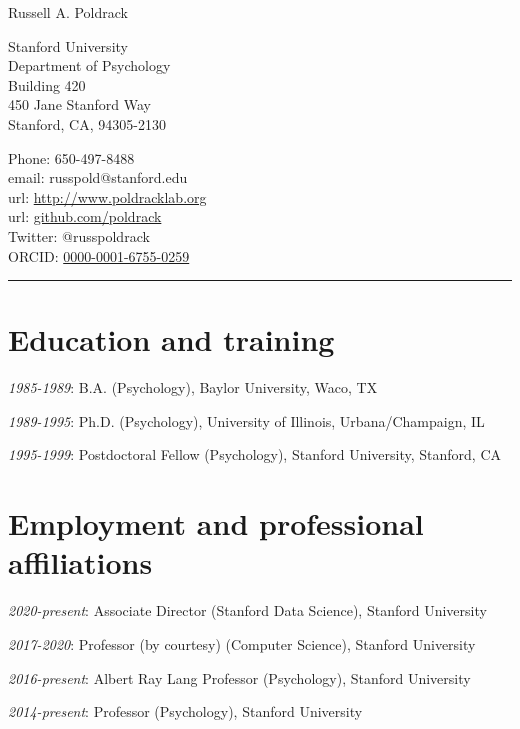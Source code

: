 \documentclass[10pt, letterpaper]{article}
\begin{document}
 
\reversemarginpar 
{\LARGE Russell A. Poldrack}\\[4mm] 
\vspace{-1cm} 

\begin{multicols}{2} 
Stanford University\\
Department of Psychology\\
Building 420\\
450 Jane Stanford Way\\
Stanford, CA, 94305-2130\\
\columnbreak 

Phone: 650-497-8488 \\
email: russpold@stanford.edu \\
url: \href{www.poldracklab.org}{http://www.poldracklab.org} \\
url: \href{http://github.com/poldrack}{github.com/poldrack} \\
Twitter: @russpoldrack \\
ORCID: \href{https://orcid.org/0000-0001-6755-0259}{0000-0001-6755-0259} \\
\end{multicols}

\hrule

\section*{Education and training}
\noindent

\textit{1985-1989}: B.A. (Psychology), Baylor University, Waco, TX

\textit{1989-1995}: Ph.D. (Psychology), University of Illinois, Urbana/Champaign, IL

\textit{1995-1999}: Postdoctoral Fellow (Psychology), Stanford University, Stanford, CA

\section*{Employment and professional affiliations}
\noindent

\textit{2020-present}: Associate Director (Stanford Data Science), Stanford University

\textit{2017-2020}: Professor (by courtesy) (Computer Science), Stanford University

\textit{2016-present}: Albert Ray Lang Professor (Psychology), Stanford University

\textit{2014-present}: Professor (Psychology), Stanford University
\end{document}
